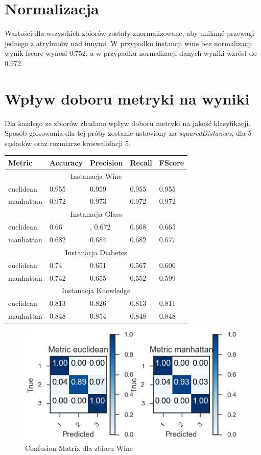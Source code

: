 \documentclass[12pt,a4paper]{article}
\begin{document}
\section{Normalizacja}
Wartości dla wszystkich zbiorów zostały znormalizowane, aby uniknąć przewagi jednego z atrybutów nad innymi. W przypadku instancji wine bez normalizacji wynik fscore wynosi 0.752, a w przypadku normalizacji danych wyniki wzrósł do 0.972.

\section{Wpływ doboru metryki na wyniki}

Dla każdego ze zbiorów zbadano wpływ doboru metryki na jakość klasyfikacji. Sposób głosowania dla tej próby zostanie ustawiony na \textit{squaredDistances}, dla 5 sąsiadów oraz rozmiarze kroswalidacji 5.\\
\begin{tabular}{ |p{2.5cm}||p{2.5cm}|p{2.5cm}|p{2.5cm}|p{2.5cm}| }
\hline
Metric &Accuracy & Precision & Recall & FScore \\
\hline
\multicolumn{5}{|c|}{Instanacja Wine}\\
\hline
euclidean & 0.955 & 0.959 & 0.955 & 0.955\\
manhattan & 0.972 & 0.973 & 0.972 & 0.972\\
\hline
\multicolumn{5}{|c|}{Instanacja Glass}\\ 
\hline
euclidean & 0.66 &, 0.672 & 0.668 & 0.665\\
manhattan & 0.682 & 0.684 & 0.682 & 0.677\\
\hline
\multicolumn{5}{|c|}{Instanacja Diabetes}\\  
\hline
euclidean & 0.74 & 0.651 & 0.567 & 0.606\\
manhattan & 0.742 & 0.655 & 0.552 & 0.599\\
\hline
\multicolumn{5}{|c|}{Instanacja Knowledge}\\  
\hline
euclidean & 0.813 & 0.826 & 0.813 & 0.811\\
manhattan & 0.848 & 0.854 & 0.848 & 0.848\\
\hline
\end{tabular}

\begin{figure}[H]
\centering
\includegraphics[width=1\textwidth]{MetricsWine.PNG}
\caption{Confusion Matrix dla zbioru Wine}
\end{figure}
\end{document}
